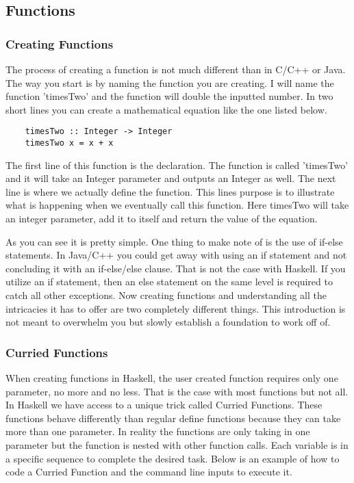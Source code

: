 \documentclass{article}
\begin{document}
\subsection{Functions}
    
    \subsubsection{Creating Functions}
    The process of creating a function is not much different than in C/C++ or Java. The way you start is by naming the function you are creating. I will name the function 'timesTwo' and the function will double the inputted number. In two short lines you can create a mathematical equation like the one listed below. 
    
    \begin{lstlisting}
    timesTwo :: Integer -> Integer
    timesTwo x = x + x 
    \end{lstlisting}
    
    \medskip
    The first line of this function is the declaration. The function is called 'timesTwo' and it will take an Integer parameter and outputs an Integer as well. The next line is where we actually define the function. This lines purpose is to illustrate what is happening when we eventually call this function. Here timesTwo will take an integer parameter, add it to itself and return the value of the equation. 
    
    \medskip
    As you can see it is pretty simple. One thing to make note of is the use of if-else statements. In Java/C++ you could get away with using an if statement and not concluding it with an if-else/else clause. That is not the case with Haskell. If you utilize an if statement, then an else statement on the same level is required to catch all other exceptions. Now creating functions and understanding all the intricacies it has to offer are two completely different things. This introduction is not meant to overwhelm you but slowly establish a foundation to work off of.
    
    \subsubsection{Curried Functions}
    When creating functions in Haskell, the user created function requires only one parameter, no more and no less. That is the case with most functions but not all. In Haskell we have access to a unique trick called Curried Functions. These functions behave differently than regular define functions because they can take more than one parameter. In reality the functions are only taking in one parameter but the function is nested with other function calls. Each variable is in a specific sequence to complete the desired task. Below is an example of how to code a Curried Function and the command line inputs to execute it. 
    
\end{document}
